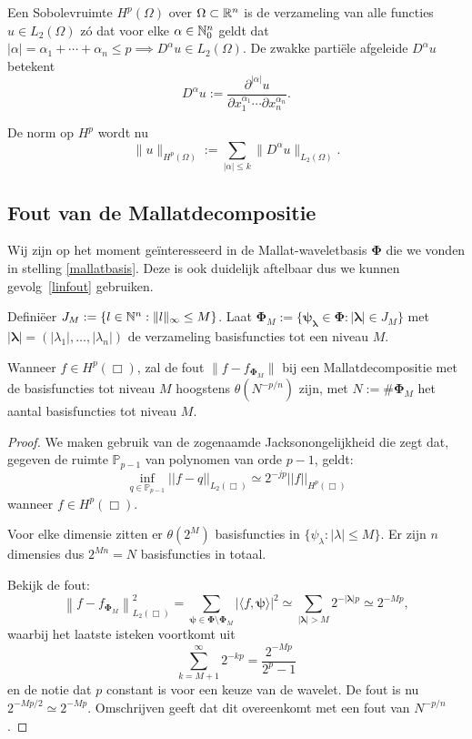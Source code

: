 \begin{definitie}[Sobolevruimte]
Een Sobolevruimte $H^p(\Omega)$ over $\Omega \subset \mathbb{R}^n$ is de verzameling van alle functies $u \in L_2(\Omega)$ z\'o dat voor elke $\alpha \in \mathbb{N}_0^n$ geldt dat $|\alpha| = \alpha_1 + \cdots + \alpha_n \leq p \implies D^\alpha u \in L_2(\Omega)$. De zwakke parti\"ele afgeleide $D^\alpha u$ betekent
\[
	D^\alpha u := \frac{\partial^{|\alpha|} u}{\partial x_1^{\alpha_1} \cdots \partial x_n^{\alpha_n} }.
\]

De norm op $H^p$ wordt nu
\[
	\| u \|_{H^p(\Omega)} := \sum_{|\alpha| \leq k} \| D^\alpha u \|_{L_2(\Omega)}.
\]
\end{definitie}

\subsection{Fout van de Mallatdecompositie}
Wij zijn op het moment ge\"interesseerd in de Mallat-waveletbasis $\boldsymbol\Phi$ die we vonden in stelling \ref{mallatbasis}. Deze is ook duidelijk aftelbaar dus we kunnen gevolg~\ref{linfout} gebruiken. 

Defini\"eer $J_M := \{ l \in \mathbb{N}^n: \| l \|_\infty \leq M \}$. Laat $\boldsymbol\Phi_M := \{ \boldsymbol{\psi}_{\boldsymbol{\lambda}} \in \boldsymbol\Phi: |\boldsymbol\lambda| \in J_M \}$ met $|\boldsymbol\lambda| = (|\lambda_1|, \ldots, |\lambda_n|)$ de verzameling basisfuncties tot een niveau $M$.

\begin{stelling}
\label{thm:foutmallat}
Wanneer $f \in H^p(\Box)$, zal de fout $\| f - f_{\boldsymbol\Phi_M} \|$ bij een Mallatdecompositie met de basisfuncties tot niveau $M$ hoogstens $\theta(N^{-p/n})$ zijn, met $N := \# \boldsymbol\Phi_M$ het aantal basisfuncties tot niveau $M$.
\end{stelling}
\begin{proof}

  We maken gebruik van de zogenaamde Jacksonongelijkheid \cite{jackson} die zegt dat, gegeven de ruimte $\mathbb{P}_{p-1}$ van polynomen van orde $p-1$, geldt: 
  \[
  \inf_{q \in \mathbb{P}_{p-1}} ||f - q||_{L_2(\Box)} \simeq 2^{-jp} ||f||_{H^p(\Box)}
  \]
  wanneer $f \in H^p(\Box)$.

  Voor elke dimensie zitten er $\theta(2^M)$ basisfuncties in $\{ \psi_\lambda: |\lambda| \leq M \}$. Er zijn $n$ dimensies dus $2^{Mn} = N$ basisfuncties in totaal.

  Bekijk de fout:
  \[
  \left\| f - f_{\boldsymbol\Phi_M} \right\|^2_{L_2(\Box)} = \sum_{{\boldsymbol\psi} \in \boldsymbol\Phi \setminus \boldsymbol\Phi_M} | \langle f, \boldsymbol\psi \rangle |^2 \simeq \sum_{|\boldsymbol\lambda| > M} 2^{-|\boldsymbol\lambda|p} \simeq 2^{-Mp},
  \]
  waarbij het laatste isteken voortkomt uit
  \[
  \sum_{k=M+1}^\infty 2^{- kp} = \frac{2^{-Mp}}{2^p-1}
  \]
  en de notie dat $p$ constant is voor een keuze van de wavelet. De fout is nu $2^{-Mp/2} \simeq 2^{-Mp}$. Omschrijven geeft dat dit overeenkomt met een fout van $N^{-p/n}$.
\end{proof}

